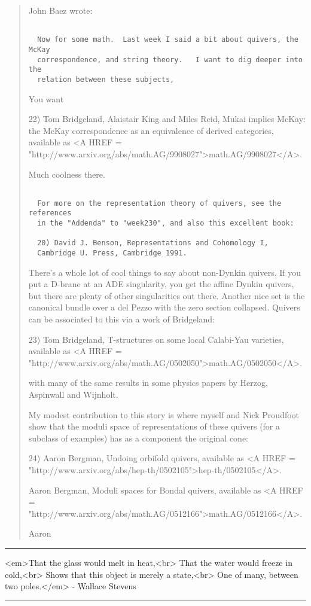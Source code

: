\begin{quote}
  John Baez wrote:

\begin{verbatim}

  Now for some math.  Last week I said a bit about quivers, the McKay 
  correspondence, and string theory.   I want to dig deeper into the 
  relation between these subjects,
\end{verbatim}
    

  You want

22) Tom Bridgeland, Alaistair King and Miles Reid, Mukai implies 
McKay: the McKay correspondence as an equivalence of derived categories,
available as <A HREF = "http://www.arxiv.org/abs/math.AG/9908027">math.AG/9908027</A>.

  Much coolness there.


\begin{verbatim}

  For more on the representation theory of quivers, see the references 
  in the "Addenda" to "week230", and also this excellent book:
  
  20) David J. Benson, Representations and Cohomology I, 
  Cambridge U. Press, Cambridge 1991.  
\end{verbatim}
    

There's a whole lot of cool things to say about non-Dynkin quivers. If
  you put a D-brane at an ADE singularity, you get the affine Dynkin
  quivers, but there are plenty of other singularities out there. Another
  nice set is the canonical bundle over a del Pezzo with the zero section
  collapsed. Quivers can be associated to this via a work of Bridgeland:

  23) Tom Bridgeland, T-structures on some local Calabi-Yau varieties,
  available as <A HREF = "http://www.arxiv.org/abs/math.AG/0502050">math.AG/0502050</A>.

  with many of the same results in some physics papers by Herzog,
  Aspinwall and Wijnholt.

  My modest contribution to this story is where myself and Nick Proudfoot
  show that the moduli space of representations of these quivers (for a
  subclass of examples) has as a component the original cone:

  24) Aaron Bergman, Undoing orbifold quivers, available as
  <A HREF = "http://www.arxiv.org/abs/hep-th/0502105">hep-th/0502105</A>.

  Aaron Bergman, Moduli spaces for Bondal quivers, available as
  <A HREF = "http://www.arxiv.org/abs/math.AG/0512166">math.AG/0512166</A>.

  Aaron
\end{quote}


\par\noindent\rule{\textwidth}{0.4pt}
<em>That the glass would melt in heat,<br>
That the water would freeze in cold,<br>
Shows that this object is merely a state,<br>
One of many, between two poles.</em> - Wallace Stevens

\par\noindent\rule{\textwidth}{0.4pt}

